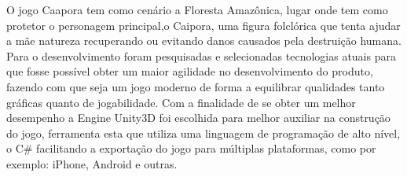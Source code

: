 O jogo Caapora tem como cenário a Floresta Amazônica, lugar onde tem como protetor o personagem principal,o Caipora, uma figura folclórica que tenta ajudar a mãe natureza recuperando ou evitando danos causados pela destruição humana.
Para o desenvolvimento foram pesquisadas e selecionadas tecnologias atuais para que fosse possível obter um maior agilidade no desenvolvimento do produto, fazendo com que seja um jogo moderno de forma a equilibrar qualidades tanto gráficas quanto de jogabilidade. Com a finalidade de se obter um melhor desempenho a Engine Unity3D foi escolhida para melhor auxiliar na construção do jogo, ferramenta esta que utiliza uma linguagem de programação de alto nível, o C# facilitando a exportação do jogo para múltiplas plataformas, como por exemplo: iPhone, Android e outras.

